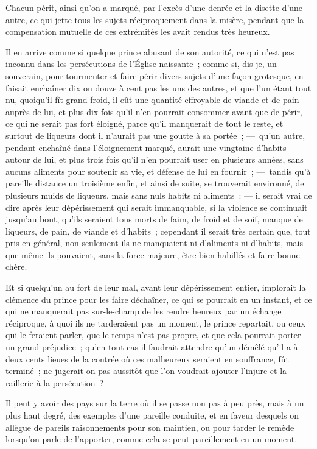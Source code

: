 \documentclass[french,twoside]{book} %
\begin{document}
Chacun périt, ainsi qu’on a marqué, par l’excès d’une denrée et la disette d’une autre, ce qui jette tous les sujets réciproquement dans la misère, pendant que la compensation mutuelle de ces extrémités les avait rendus très heureux.\par
Il en arrive comme si quelque prince abusant de son autorité, ce qui n’est pas inconnu dans les persécutions de l’Église naissante ; comme si, dis-je, un souverain, pour tourmenter et faire périr divers sujets d’une façon grotesque, en faisait enchaîner dix ou douze à cent pas les uns des autres, et que l’un étant tout nu, quoiqu’il fît grand froid, il eût une quantité effroyable de viande et de pain auprès de lui, et plus dix fois qu’il n’en pourrait consommer avant que de périr, ce qui ne serait pas fort éloigné, parce qu’il manquerait de tout le reste, et surtout de liqueurs dont il n’aurait pas une goutte à sa portée ; — qu’un autre, pendant enchaîné dans l’éloignement marqué, aurait une vingtaine d’habits autour de lui, et plus trois fois qu’il n’en pourrait user en plusieurs années, sans aucuns aliments pour soutenir sa vie, et défense de lui en fournir ; — tandis qu’à pareille distance un troisième enfin, et ainsi de suite, se trouverait environné, de plusieurs muids de liqueurs, mais sans nuls habits ni aliments : — il serait vrai de dire après leur dépérissement qui serait immanquable, si la violence se continuait jusqu’au bout, qu’ils seraient tous morts de faim, de froid et de soif, manque de liqueurs, de pain, de viande et d’habits ; cependant il serait très certain que, tout pris en général, non seulement ils ne manquaient ni d’aliments ni d’habits, mais que même ils pouvaient, sans la force majeure, être bien habillés et faire bonne chère.\par
Et si quelqu’un au fort de leur mal, avant leur dépérissement entier, implorait la clémence du prince pour les faire déchaîner, ce qui se pourrait en un instant, et ce qui ne manquerait pas sur-le-champ de les rendre heureux par un échange réciproque, à quoi ils ne tarderaient pas un moment, le prince repartait, ou ceux qui le feraient parler, que le temps n’est pas propre, et que cela pourrait porter un grand préjudice ; qu’en tout cas il faudrait attendre qu’un démêlé qu’il a à deux cents lieues de la contrée où ces malheureux seraient en souffrance, fût terminé ; ne jugerait-on pas aussitôt que l’on voudrait ajouter l’injure et la raillerie à la persécution ?\par
Il peut y avoir des pays sur la terre où il se passe non pas à peu près, mais à un plus haut degré, des exemples d’une pareille conduite, et en faveur desquels on allègue de pareils raisonnements pour son maintien, ou pour tarder le remède lorsqu’on parle de l’apporter, comme cela se peut pareillement en un moment.\par
\end{document}
